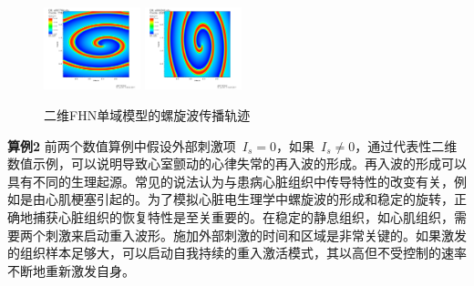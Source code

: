 \documentclass[twoside,UTF8]{nputhesis}
\begin{document}
\begin{figure}[htb]
	\centering
	{\includegraphics[width=0.25\textwidth,height=0.2\textwidth]{figures/7784.jpg}}
	\hspace{0.2\textwidth}
	{	\includegraphics[width=0.25\textwidth,height=0.2\textwidth]{figures/6269.jpg}}
	\hspace{0.2\textwidth}
	\hspace{0.2\textwidth}
	\caption{二维FHN单域模型的螺旋波传播轨迹}
	\label{fig2}
\end{figure}

\textbf{算例2}  前两个数值算例中假设外部刺激项~$I_s=0$，如果~$I_s\neq0$，通过代表性二维数值示例，可以说明导致心室颤动的心律失常的再入波的形成。再入波的形成可以具有不同的生理起源。常见的说法认为与患病心脏组织中传导特性的改变有关，例如是由心肌梗塞引起的。为了模拟心脏电生理学中螺旋波的形成和稳定的旋转，正确地捕获心脏组织的恢复特性是至关重要的。在稳定的静息组织，如心肌组织，需要两个刺激来启动重入波形。施加外部刺激的时间和区域是非常关键的。如果激发的组织样本足够大，可以启动自我持续的重入激活模式，其以高但不受控制的速率不断地重新激发自身。
\end{document}
